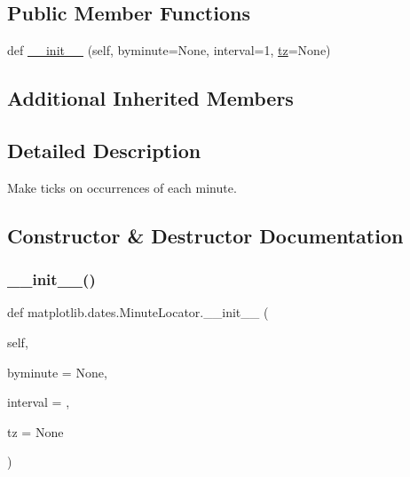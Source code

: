 \subsection*{Public Member Functions}
\begin{DoxyCompactItemize}
\item 
def \hyperlink{classmatplotlib_1_1dates_1_1MinuteLocator_af598f7ca468ec1018362ac6ada9af247}{\+\_\+\+\_\+init\+\_\+\+\_\+} (self, byminute=None, interval=1, \hyperlink{classmatplotlib_1_1dates_1_1DateLocator_aa18faf34dbf00ed4820535b64cd7194e}{tz}=None)
\end{DoxyCompactItemize}
\subsection*{Additional Inherited Members}


\subsection{Detailed Description}
\begin{DoxyVerb}Make ticks on occurrences of each minute.
\end{DoxyVerb}
 

\subsection{Constructor \& Destructor Documentation}
\mbox{\label{classmatplotlib_1_1dates_1_1MinuteLocator_af598f7ca468ec1018362ac6ada9af247}} 
\subsubsection{\texorpdfstring{\+\_\+\+\_\+init\+\_\+\+\_\+()}{\_\_init\_\_()}}
{\footnotesize\ttfamily def matplotlib.\+dates.\+Minute\+Locator.\+\_\+\+\_\+init\+\_\+\+\_\+ (\begin{DoxyParamCaption}\item[{}]{self,  }\item[{}]{byminute = {\ttfamily None},  }\item[{}]{interval = {},  }\item[{}]{tz = {\ttfamily None} }\end{DoxyParamCaption})}

